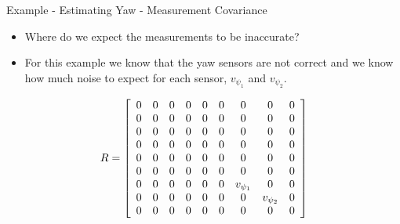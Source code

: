 \documentclass[hyperref={pdfpagelabels=false}]{beamer}
\begin{document}
\begin{frame}{Example - Estimating Yaw - Measurement Covariance}
\begin{itemize}
\item Where do we expect the measurements to be inaccurate?
\item For this example we know that the yaw sensors are not correct and we know how much noise to expect for each sensor, $v_{\psi_1}$ and $v_{\psi_2}$.
\end{itemize}
\begin{align*}
R = \left[\begin{array}{c c c c c c c c c}
0 & 0 & 0 & 0 & 0 & 0 & 0 & 0 & 0 \\
0 & 0 & 0 & 0 & 0 & 0 & 0 & 0 & 0 \\
0 & 0 & 0 & 0 & 0 & 0 & 0 & 0 & 0 \\
0 & 0 & 0 & 0 & 0 & 0 & 0 & 0 & 0 \\
0 & 0 & 0 & 0 & 0 & 0 & 0 & 0 & 0 \\
0 & 0 & 0 & 0 & 0 & 0 & 0 & 0 & 0 \\
0 & 0 & 0 & 0 & 0 & 0 & v_{\psi_1} & 0 & 0 \\
0 & 0 & 0 & 0 & 0 & 0 & 0 & v_{\psi_2} & 0 \\
0 & 0 & 0 & 0 & 0 & 0 & 0 & 0 & 0
\end{array}\right]
\end{align*}
\end{frame}
\end{document}
